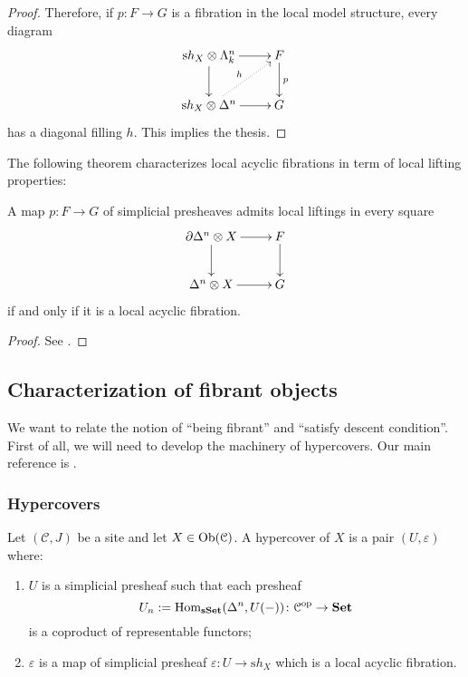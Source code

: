 \begin{refsection}
\begin{proof}
Therefore, if $p \colon F \to G$ is a fibration in the local model structure, every diagram
\[
\xymatrix{ \mathrm sh_X \otimes \Lambda^n_k \ar[d] \ar[r] & F \ar[d]^p \\ \mathrm sh_X \otimes \Delta^n \ar@{.>}[ur]^h \ar[r] & G }
\]
has a diagonal filling $h$. This implies the thesis.
\end{proof}

The following theorem characterizes local acyclic fibrations in term of local lifting properties:

\begin{thm} \label{thm local acyclic fibrations}
A map $p \colon F \to G$ of simplicial presheaves admits local liftings in every square
\[
\xymatrix{
\partial \Delta^n \otimes X \ar[r] \ar[d] & F \ar[d] \\ \Delta^n \otimes X \ar[r] & G
}
\]
if and only if it is a local acyclic fibration.
\end{thm}

\begin{proof}
See \cite[Prop. 7.2]{weakequivalences}.
\end{proof}

\subsection{Characterization of fibrant objects}

We want to relate the notion of ``being fibrant'' and ``satisfy descent condition''. First of all, we will need to develop the machinery of hypercovers. Our main reference is \cite{hypercover}.

\subsubsection{Hypercovers}

\begin{defin}
Let $(\mathcal C, J)$ be a site and let $X \in \operatorname{Ob}(\mathcal C)$. A hypercover of $X$ is a pair $(U,\varepsilon)$ where:
\begin{enumerate}
\item $U$ is a simplicial presheaf such that each presheaf
\[
U_n := \mathrm{Hom}_{\mathbf{sSet}}(\Delta^n, U(-)) \colon \mathcal C^{\mathrm{op}} \to \mathbf{Set}
\]
is a coproduct of representable functors;
\item $\varepsilon$ is a map of simplicial presheaf $\varepsilon \colon U \to \mathrm sh_X$ which is a local acyclic fibration.
\end{enumerate}
\end{defin}


\end{refsection}
